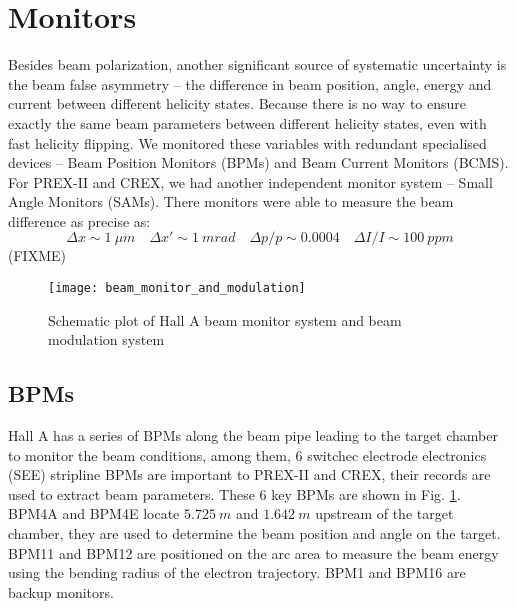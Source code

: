 \section{Monitors}
Besides beam polarization, another significant source of systematic uncertainty
is the beam false asymmetry -- the difference in beam position, angle, energy and
current between different helicity states. Because there is no way to ensure
exactly the same beam parameters between different helicity states, even with fast
helicity flipping. We monitored these variables with redundant specialised devices
-- Beam Position Monitors (BPMs) and Beam Current Monitors (BCMS). For PREX-II
and CREX, we had another independent monitor system -- Small Angle Monitors (SAMs).
There monitors were able to measure the beam difference as precise as:
$$ \Delta x \sim 1\ \mu m \quad \Delta x' \sim 1\ mrad \quad \Delta p/p \sim 0.0004 \quad \Delta I/I \sim 100 \ ppm$$ (FIXME)
\begin{figure}[h!]
    \centering
    \texttt{[image: beam\_monitor\_and\_modulation]}
    \caption{Schematic plot of Hall A beam monitor system and beam modulation system}
    \label{fig:hall_a_monitors_and_modulation}
\end{figure}

\begin{comment}
    \begin{itemize}
	\item beam correlations
	\item monitor precision (resolution): double difference width
	\item noise
	\item pedestal: calibration
	\item cross-correlation
    \end{itemize}
\end{comment}

\subsection{BPMs}
\begin{comment}
Cross check, and unfold beam fluctuation noise from instrumentation noise
\end{comment}
Hall A has a series of BPMs along the beam pipe leading to the target chamber
to monitor the beam conditions, among them, 6 switchec electrode electronics (SEE) 
stripline BPMs are important to PREX-II and CREX, 
their records are used to extract beam parameters. These 6
key BPMs are shown in Fig. \ref{fig:hall_a_monitors_and_modulation}. 
BPM4A and BPM4E locate $5.725\ m$ and $1.642\ m$ upstream of the target chamber, 
they are used to determine the beam position and angle on the target. BPM11 and BPM12
are positioned on the arc area to measure the beam energy using the bending 
radius of the electron trajectory. BPM1 and BPM16 are backup monitors.

